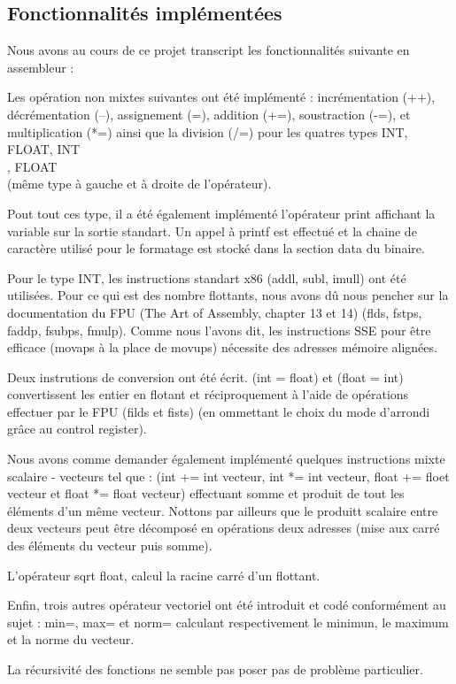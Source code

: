 \documentclass[a4paper, 11pt]{article}
\begin{document}
\subsection{Fonctionnalités implémentées}

Nous avons au cours de ce projet transcript les fonctionnalités suivante en assembleur :

Les opération non mixtes suivantes ont été implémenté : 
incrémentation (++), décrémentation (--), assignement (=), addition (+=), soustraction (-=), et multiplication (*=) ainsi que la division (/=)
pour les quatres types INT, FLOAT, INT\[\], FLOAT\[\] (même type à gauche et à droite de l'opérateur).

Pout tout ces type, il a été également implémenté l'opérateur print affichant la variable sur la sortie standart. Un appel à printf est effectué et 
la chaine de caractère utilisé pour le formatage est stocké dans la section data du binaire.

Pour le type INT, les instructions standart x86 (addl, subl, imull) ont été utilisées. Pour ce qui est des nombre flottants, nous avons dû nous
pencher sur la documentation du FPU (The Art of Assembly, chapter 13 et 14) (flds, fstps, faddp, fsubps, fmulp).
Comme nous l'avons dit, les instructions SSE pour être efficace (movaps à la place de movups) nécessite des adresses mémoire alignées.

Deux instrutions de conversion ont été écrit. (int = float) et (float = int) convertissent les entier en flotant et réciproquement à l'aide
de opérations effectuer par le FPU (filds et fists) (en ommettant le choix du mode d'arrondi grâce au control register).

Nous avons comme demander également implémenté quelques instructions mixte scalaire - vecteurs tel que :
(int += int vecteur, int *= int vecteur, float += floet vecteur et float *= float vecteur) effectuant somme et produit de tout les éléments
d'un même vecteur. Nottons par ailleurs que le produitt scalaire entre deux vecteurs peut être décomposé en opérations deux adresses 
(mise aux carré des éléments du vecteur puis somme).

L'opérateur sqrt float, calcul la racine carré d'un flottant.

Enfin, trois autres opérateur vectoriel ont été introduit et codé conformément au sujet : min=, max= et norm= calculant respectivement
le minimun, le maximum et la norme du vecteur.

La récursivité des fonctions ne semble pas poser pas de problème particulier.
\end{document}
